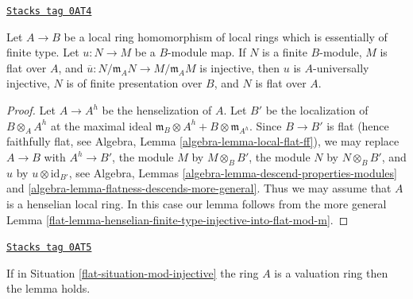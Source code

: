 \begin{lemma}
\label{flat-lemma-upstairs-finite-type-injective-into-flat-mod-m}
\href{https://stacks.math.columbia.edu/tag/0AT4}{\texttt{Stacks tag 0AT4}}

Let $A \to B$ be a local ring homomorphism of local rings which is
essentially of finite type. Let $u : N \to M$ be a $B$-module map.
If $N$ is a finite $B$-module, $M$ is flat over $A$, and
$\overline{u} : N/\mathfrak m_A N \to M/\mathfrak m_A M$ is injective,
then $u$ is $A$-universally injective, $N$ is of finite presentation over
$B$, and $N$ is flat over $A$.
\end{lemma}

\begin{proof}

Let $A \to A^h$ be the henselization of $A$. Let $B'$ be the localization
of $B \otimes_A A^h$ at the maximal ideal
$\mathfrak m_B \otimes A^h + B \otimes \mathfrak m_{A^h}$.
Since $B \to B'$ is flat (hence faithfully flat, see
Algebra, Lemma \ref{algebra-lemma-local-flat-ff}),
we may replace $A \to B$ with $A^h \to B'$,
the module $M$ by $M \otimes_B B'$, the module $N$ by $N \otimes_B B'$,
and $u$ by $u \otimes \text{id}_{B'}$, see
Algebra, Lemmas \ref{algebra-lemma-descend-properties-modules} and
\ref{algebra-lemma-flatness-descends-more-general}.
Thus we may assume that $A$ is a henselian local ring.
In this case our lemma follows from the more general
Lemma \ref{flat-lemma-henselian-finite-type-injective-into-flat-mod-m}.
\end{proof}

\begin{lemma}
\label{flat-lemma-valuation-ring-finite-type-injective-into-flat-mod-m}
\href{https://stacks.math.columbia.edu/tag/0AT5}{\texttt{Stacks tag 0AT5}}

If in Situation \ref{flat-situation-mod-injective} the ring $A$ is a
valuation ring then the lemma holds.
\end{lemma}

